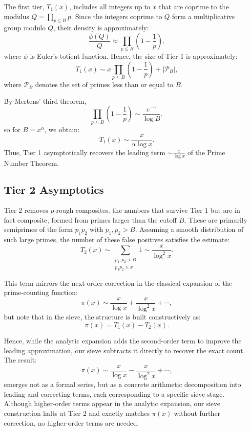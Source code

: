 \documentclass[11pt]{article}
\begin{document}
	The first tier, $T_1(x)$, includes all integers up to $x$ that are coprime to the modulus $Q = \prod_{p \leq B} p$. Since the integers coprime to $Q$ form a multiplicative group modulo $Q$, their density is approximately:
	\[
	\frac{\phi(Q)}{Q} \approx \prod_{p \leq B} \left(1 - \frac{1}{p} \right),
	\]
	where $\phi$ is Euler’s totient function. Hence, the size of Tier 1 is approximately:
	\[
	T_1(x) \sim x \prod_{p \leq B} \left(1 - \frac{1}{p} \right) + |\mathcal{P}_B|,
	\]
	where $\mathcal{P}_B$ denotes the set of primes less than or equal to $B$.
	
	By Mertens’ third theorem,
	\[
	\prod_{p \leq B} \left(1 - \frac{1}{p} \right) \sim \frac{e^{-\gamma}}{\log B},
	\]
	so for $B = x^\alpha$, we obtain:
	\[
	T_1(x) \sim \frac{x}{\alpha \log x}.
	\]
	Thus, Tier 1 asymptotically recovers the leading term $\sim \frac{x}{\log x}$ of the Prime Number Theorem.
	
	\subsection{Tier 2 Asymptotics}
	
	Tier 2 removes $p$-rough composites, the numbers that survive Tier 1 but are in fact composite, formed from primes larger than the cutoff $B$. These are primarily semiprimes of the form $p_1 p_2$ with $p_1, p_2 > B$. Assuming a smooth distribution of such large primes, the number of these false positives satisfies the estimate:
	\[
	T_2(x) \sim \sum_{\substack{p_1, p_2 > B \\ p_1 p_2 \leq x}} 1 \sim \frac{x}{\log^2 x}.
	\]
	
	This term mirrors the next-order correction in the classical expansion of the prime-counting function:
	\[
	\pi(x) \sim \frac{x}{\log x} + \frac{x}{\log^2 x} + \cdots,
	\]
	but note that in the sieve, the structure is built constructively as:
	\[
	\pi(x) = T_1(x) - T_2(x).
	\]
	
	Hence, while the analytic expansion adds the second-order term to improve the leading approximation, our sieve subtracts it directly to recover the exact count. The result:
	\[
	\pi(x) \sim \frac{x}{\log x} - \frac{x}{\log^2 x} + \cdots,
	\]
	emerges not as a formal series, but as a concrete arithmetic decomposition into leading and correcting terms, each corresponding to a specific sieve stage. Although higher-order terms appear in the analytic expansion, our sieve construction halts at Tier 2 and exactly matches $\pi(x)$ without further correction, no higher-order terms are needed.
	
\end{document}
